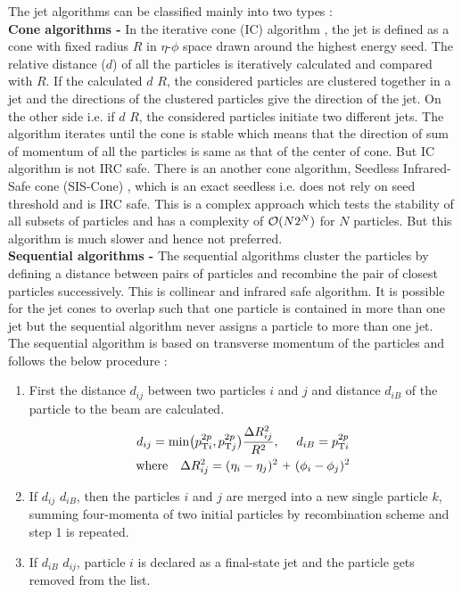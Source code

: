 The jet algorithms can be classified mainly into two types : \\ \newline
{\bf Cone algorithms -} In the iterative cone (IC) algorithm \cite{Blazey:2000qt}, the jet is defined as a cone with fixed radius $R$ in $\eta$-$\phi$ space drawn around the highest energy seed. The relative distance ($d$) of all the particles is iteratively calculated and compared with $R$. If the calculated $d$ \ls $R$, the considered particles are clustered together in a jet and the directions of the clustered particles give the direction of the jet. On the other side i.e. if $d$ \gr $R$, the considered particles initiate two different jets. The algorithm iterates until the cone is stable which means that the direction of sum of momentum of all the particles is same as that of the center of cone. But IC algorithm is not IRC safe. There is an another cone algorithm, Seedless Infrared-Safe cone (SIS-Cone) \cite{Weinzierl:2011jx}, which is an exact seedless i.e. does not rely on seed threshold and is IRC safe. This is a complex approach which tests the stability of all subsets of particles and has a complexity of ${\cal O}(N2^{N})$ for $N$ particles. But this algorithm is much slower and hence not preferred. \\ \newline
{\bf Sequential algorithms -} The sequential algorithms \cite{Ellis:1993tq} cluster the particles by defining a distance between pairs of particles and recombine the pair of closest particles successively. This is collinear and infrared safe algorithm. It is possible for the jet cones to overlap such that one particle is contained in more than one jet but the sequential algorithm never assigns a particle to more than one jet. The sequential algorithm is based on transverse momentum \pt of the particles and follows the below procedure : 
\begin{enumerate}
\item First the distance $d_{ij}$ between two particles $i$ and $j$ and distance $d_{iB}$ of the particle to the beam are calculated.
 \begin{equation}
\begin{gathered}
d_{ij} = {\rm min}\big(p^{2p}_{{\rm T}i},p^{2p}_{{\rm T}j}\big) \frac{\Delta R^2_{ij}}{R^2}, ~~~~d_{iB} = p^{2p}_{{\rm T}i} \\ {\rm where} ~~~\Delta R^2_{ij} = (\eta_i -\eta_j)^{2} ~\plus (\phi_i -\phi_j)^{2}
\end{gathered}
\end{equation}

\item If $d_{ij}$ \ls $d_{iB}$, then the particles $i$ and $j$ are merged into a new single particle $k$, summing four-momenta of two initial particles by recombination scheme and step 1 is repeated. 
\item If $d_{iB}$ \ls $d_{ij}$, particle $i$ is declared as a final-state jet and the particle gets removed from the list. 
\end{enumerate}
